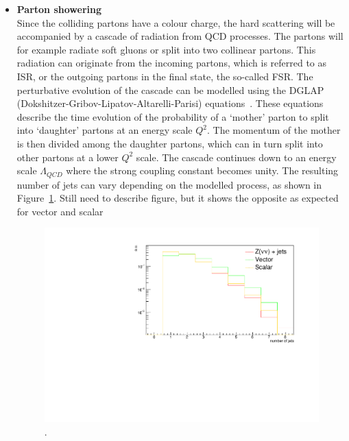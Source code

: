 \begin{itemize}
 \item[] \textbf{Parton showering}\\
Since the colliding partons have a colour charge, the hard scattering will be accompanied by a cascade of radiation from \acs{QCD} processes. The partons will for example radiate soft gluons or split into two collinear partons. This radiation can originate from the incoming partons, which is referred to as \ac{ISR}, or the outgoing partons in the final state, the so-called \ac{FSR}. The perturbative evolution of the cascade can be modelled using the DGLAP (Dokshitzer-Gribov-Lipatov-Altarelli-Parisi) equations~\cite{Gribov:1972ri, Dokshitzer:1977sg, Altarelli:1977zs}. These equations describe the time evolution of the probability of a `mother' parton to split into `daughter' partons at an energy scale $Q^2$. The momentum of the mother is then divided among the daughter partons, which can in turn split into other partons at a lower $Q^2$ scale. The cascade continues down to an energy scale $\Lambda_{QCD}$ where the strong coupling constant becomes unity. The resulting number of jets can vary depending on the modelled process, as shown in Figure~\ref{fig:njets}. {\color{red}Still need to describe figure, but it shows the opposite as expected for vector and scalar}

\begin{figure}[ht]
  \centering
 \includegraphics[width=.7\textwidth]{njets.pdf} 
 \caption{.}
 \label{fig:njets}
\end{figure}


\end{itemize}
